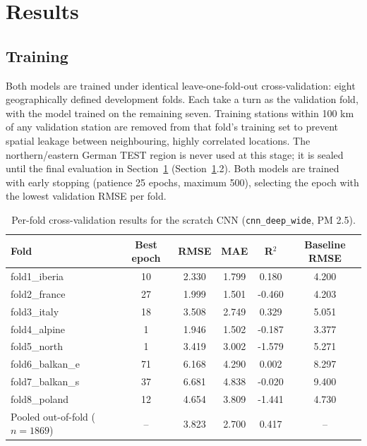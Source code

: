 \documentclass[english, a4paper, numbers=noenddot]{article}
\begin{document}
\section{Results}
\label{sec:results}

\subsection{Training}

Both models are trained under identical leave-one-fold-out cross-validation: eight geographically defined development folds. Each take a turn as the validation fold, with the model trained on the remaining seven. Training stations within 100 km of any validation station are removed from that fold's training set to prevent spatial leakage between neighbouring, highly correlated locations. The northern/eastern German TEST region is never used at this stage; it is sealed until the final evaluation in Section~\ref{sec:results} (Section~\ref{sec:results}.2). Both models are trained with early stopping (patience 25 epochs, maximum 500), selecting the epoch with the lowest validation RMSE per fold.

\begin{table}[h]
\centering
\caption{Per-fold cross-validation results for the scratch CNN (\texttt{cnn\_deep\_wide}, PM 2.5).}
\label{tab:cnn_deep_wide_folds}
\begin{tabular}{lccccc}
\hline
\textbf{Fold} & \textbf{Best epoch} & \textbf{RMSE} & \textbf{MAE} & \textbf{R}$^2$ & \textbf{Baseline RMSE} \\
\hline
fold1\_iberia    & 10 & 2.330 & 1.799 & 0.180  & 4.200 \\
fold2\_france    & 27 & 1.999 & 1.501 & -0.460 & 4.203 \\
fold3\_italy     & 18 & 3.508 & 2.749 & 0.329  & 5.051 \\
fold4\_alpine    & 1  & 1.946 & 1.502 & -0.187 & 3.377 \\
fold5\_north     & 1  & 3.419 & 3.002 & -1.579 & 5.271 \\
fold6\_balkan\_e & 71 & 6.168 & 4.290 & 0.002  & 8.297 \\
fold7\_balkan\_s & 37 & 6.681 & 4.838 & -0.020 & 9.400 \\
fold8\_poland    & 12 & 4.654 & 3.809 & -1.441 & 4.730 \\
\hline
Pooled out-of-fold ($n=1869$) & -- & 3.823 & 2.700 & 0.417 & -- \\
\hline
\end{tabular}
\end{table}
\end{document}
